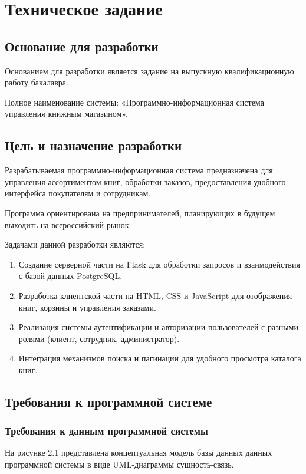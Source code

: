 \section{Техническое задание}
\subsection{Основание для разработки}

Основанием для разработки является задание на выпускную квалификационную работу бакалавра.

 Полное наименование системы: «Программно-информационная система управления книжным магазином».

\subsection{Цель и назначение разработки}

Разрабатываемая программно-информационная система предназначена для управления ассортиментом книг, обработки заказов, предоставления удобного интерфейса покупателям и сотрудникам.

Программа ориентирована на предпринимателей, планирующих в будущем выходить на всероссийский рынок.

Задачами данной разработки являются:
\begin{enumerate}
\item Создание серверной части на Flask для обработки запросов и взаимодействия с базой данных PostgreSQL.
\item Разработка клиентской части на HTML, CSS и JavaScript для отображения книг, корзины и управления заказами.
\item Реализация системы аутентификации и авторизации пользователей с разными ролями (клиент, сотрудник, администратор).
\item Интеграция механизмов поиска и пагинации для удобного просмотра каталога книг.
\end{enumerate}


\subsection{Требования к программной системе}


\subsubsection{Требования к данным программной системы}


На рисунке 2.1 представлена концептуальная модель базы данных данных программной системы в виде UML-диаграммы сущность-связь.



